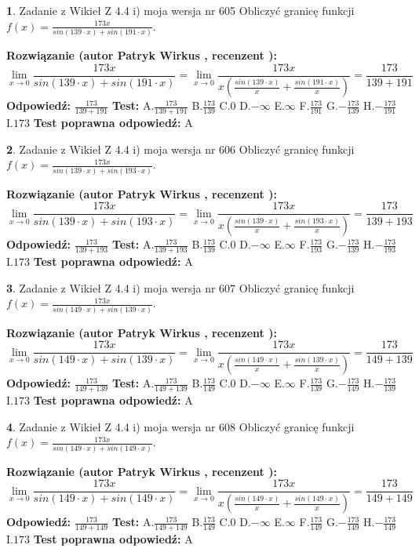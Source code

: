 \documentclass[12pt, a4paper]{article}
\theoremstyle{definition} %
\newtheorem{zad}{}
\newcommand{\zadStart}[1]{\begin{zad}#1\newline}
\newcommand{\zadStop}{\end{zad}}
\newcommand{\rozwStart}[2]{\noindent \textbf{Rozwiązanie (autor #1 , recenzent #2): }\newline}
\newcommand{\rozwStop}{\newline}
\newcommand{\odpStart}{\noindent \textbf{Odpowiedź:}\newline}
\newcommand{\odpStop}{\newline}
\newcommand{\testStart}{\noindent \textbf{Test:}\newline}
\newcommand{\testStop}{\newline}
\newcommand{\kluczStart}{\noindent \textbf{Test poprawna odpowiedź:}\newline}
\newcommand{\kluczStop}{\newline}
\begin{document}
\zadStart{Zadanie z Wikieł Z 4.4 i) moja wersja nr 605}
Obliczyć granicę funkcji $f(x)=\frac{173x}{sin(139\cdot x) +sin(191\cdot x)}$.
\zadStop
\rozwStart{Patryk Wirkus}{}
$$\lim\limits_{x\to 0}\frac{173x}{sin(139\cdot x) +sin(191\cdot x)}=\lim\limits_{x\to 0}\frac{173x}{x(\frac{sin(139\cdot x)}{x}+\frac{sin(191\cdot x)}{x})}=\frac{173}{139+191}$$
\rozwStop
\odpStart
$\frac{173}{139+191}$
\odpStop
\testStart
A.$\frac{173}{139+191}$
B.$\frac{173}{139}$
C.$0$
D.$-\infty$
E.$\infty$
F.$\frac{173}{191}$
G.$-\frac{173}{139}$
H.$-\frac{173}{191}$
I.$173$
\testStop
\kluczStart
A
\kluczStop



\zadStart{Zadanie z Wikieł Z 4.4 i) moja wersja nr 606}
Obliczyć granicę funkcji $f(x)=\frac{173x}{sin(139\cdot x) +sin(193\cdot x)}$.
\zadStop
\rozwStart{Patryk Wirkus}{}
$$\lim\limits_{x\to 0}\frac{173x}{sin(139\cdot x) +sin(193\cdot x)}=\lim\limits_{x\to 0}\frac{173x}{x(\frac{sin(139\cdot x)}{x}+\frac{sin(193\cdot x)}{x})}=\frac{173}{139+193}$$
\rozwStop
\odpStart
$\frac{173}{139+193}$
\odpStop
\testStart
A.$\frac{173}{139+193}$
B.$\frac{173}{139}$
C.$0$
D.$-\infty$
E.$\infty$
F.$\frac{173}{193}$
G.$-\frac{173}{139}$
H.$-\frac{173}{193}$
I.$173$
\testStop
\kluczStart
A
\kluczStop



\zadStart{Zadanie z Wikieł Z 4.4 i) moja wersja nr 607}
Obliczyć granicę funkcji $f(x)=\frac{173x}{sin(149\cdot x) +sin(139\cdot x)}$.
\zadStop
\rozwStart{Patryk Wirkus}{}
$$\lim\limits_{x\to 0}\frac{173x}{sin(149\cdot x) +sin(139\cdot x)}=\lim\limits_{x\to 0}\frac{173x}{x(\frac{sin(149\cdot x)}{x}+\frac{sin(139\cdot x)}{x})}=\frac{173}{149+139}$$
\rozwStop
\odpStart
$\frac{173}{149+139}$
\odpStop
\testStart
A.$\frac{173}{149+139}$
B.$\frac{173}{149}$
C.$0$
D.$-\infty$
E.$\infty$
F.$\frac{173}{139}$
G.$-\frac{173}{149}$
H.$-\frac{173}{139}$
I.$173$
\testStop
\kluczStart
A
\kluczStop



\zadStart{Zadanie z Wikieł Z 4.4 i) moja wersja nr 608}
Obliczyć granicę funkcji $f(x)=\frac{173x}{sin(149\cdot x) +sin(149\cdot x)}$.
\zadStop
\rozwStart{Patryk Wirkus}{}
$$\lim\limits_{x\to 0}\frac{173x}{sin(149\cdot x) +sin(149\cdot x)}=\lim\limits_{x\to 0}\frac{173x}{x(\frac{sin(149\cdot x)}{x}+\frac{sin(149\cdot x)}{x})}=\frac{173}{149+149}$$
\rozwStop
\odpStart
$\frac{173}{149+149}$
\odpStop
\testStart
A.$\frac{173}{149+149}$
B.$\frac{173}{149}$
C.$0$
D.$-\infty$
E.$\infty$
F.$\frac{173}{149}$
G.$-\frac{173}{149}$
H.$-\frac{173}{149}$
I.$173$
\testStop
\kluczStart
A
\kluczStop
\end{document}
